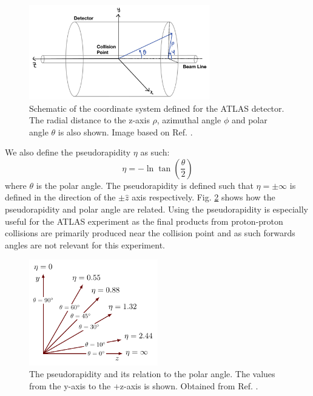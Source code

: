\documentclass[a4paper]{report}
\numberwithin{equation}{section}
\begin{document}
\begin{figure}[htpb]
    \centering
    \includegraphics[width=0.7\textwidth]{atlas_coords.png}
    \caption{Schematic of the coordinate system defined for the ATLAS detector. The radial distance to the z-axis $\rho$, 
	azimuthal angle $\phi$ and polar angle $\theta$ is also shown. Image based on Ref. \cite{Rivera2018}.}
    \label{fig:atlas_coord}
\end{figure}

We also define the pseudorapidity $\eta$ as such: 
\begin{equation}
	\eta = -\ln \tan (\frac{\theta}{2})
\end{equation}
where $\theta$ is the polar angle. The pseudorapidity is defined such that $\eta = \pm\infty$ is defined in the direction of the 
$\pm \hat{z}$ axis respectively. Fig. \ref{fig:pseudorap} shows how the pseudorapidity and polar angle are related.
Using the pseudorapidity is especially useful for the ATLAS experiment as the final products from proton-proton collisions are primarily produced 
near the collision point and as such forwards angles are not relevant for this experiment. 

\begin{figure}[htpb]
    \centering
    \includegraphics[width=0.5\textwidth]{pseudorapidity.pdf}
    \caption{The pseudorapidity and its relation to the polar angle. The values from the y-axis to the +z-axis is shown. 
	Obtained from Ref. \cite{Izaak2017}.}
    \label{fig:pseudorap}
\end{figure}
\end{document}
